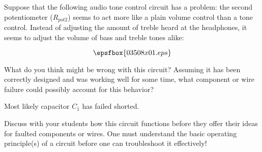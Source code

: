 

Suppose that the following audio tone control circuit has a problem: the second potentiometer ($R_{pot2}$) seems to act more like a plain volume control than a tone control.  Instead of adjusting the amount of treble heard at the headphones, it seems to adjust the volume of bass and treble tones alike:

$$\epsfbox{03508x01.eps}$$

What do you think might be wrong with this circuit?  Assuming it has been correctly designed and was working well for some time, what component or wire failure could possibly account for this behavior?







Most likely capacitor $C_1$ has failed shorted.







Discuss with your students how this circuit functions before they offer their ideas for faulted components or wires.  One must understand the basic operating principle(s) of a circuit before one can troubleshoot it effectively!




